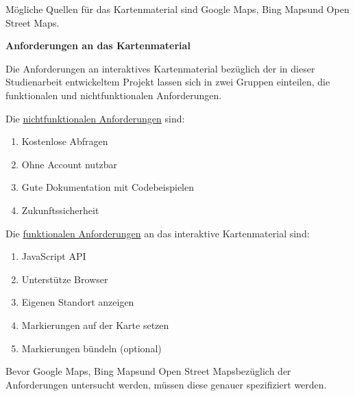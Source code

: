 Mögliche Quellen für das Kartenmaterial sind \glqq Google Maps\grqq, \glqq Bing Maps\grqq  und \glqq Open Street Maps\grqq.


\textbf{Anforderungen an das Kartenmaterial}

Die Anforderungen an interaktives Kartenmaterial bezüglich der in dieser Studienarbeit entwickeltem Projekt lassen sich in zwei Gruppen einteilen, die funktionalen und nichtfunktionalen Anforderungen.

Die \underline{nichtfunktionalen Anforderungen} sind:
\begin{enumerate}
\item Kostenlose Abfragen
\item Ohne Account nutzbar
\item Gute Dokumentation mit Codebeispielen
\item Zukunftssicherheit
\end{enumerate}

Die \underline{funktionalen Anforderungen} an das interaktive Kartenmaterial sind:
\begin{enumerate}
\item JavaScript API
\item Unterstütze Browser
\item Eigenen Standort anzeigen
\item Markierungen auf der Karte setzen
\item Markierungen bündeln (optional)
\end{enumerate}

Bevor \glqq Google Maps\grqq, \glqq Bing Maps\grqq  und \glqq Open Street Maps\grqq bezüglich der Anforderungen untersucht werden, müssen diese genauer spezifiziert werden.

